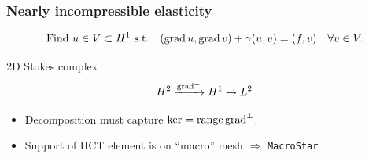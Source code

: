 \documentclass[presentation,aspectratio=43, 10pt]{beamer}
\DeclareMathOperator{\grad}{grad}
\let\div\relax
\DeclareMathOperator{\div}{div}
\DeclareMathOperator{\range}{range}
\begin{document}
\begin{frame}[fragile,t]
  \frametitle{Nearly incompressible elasticity}
  \vspace*{-1.5\baselineskip}
  \begin{equation*}
    \text{Find $u \in V \subset H^1$ s.t.} \quad (\grad u, \grad v) + \gamma (\div u, \div v) = (f, v) \quad \forall v \in V.
  \end{equation*}
  \vspace*{-\baselineskip}
  \begin{block}{2D Stokes complex}
    \begin{equation*}
      H^2 \xrightarrow{\grad^\perp} H^1 \xrightarrow{\div} L^2
    \end{equation*}
    \vspace*{-\baselineskip}
    \begin{center}
      
    \end{center}
    \begin{itemize}
    \item Decomposition must capture $\ker \div = \range \grad^\perp$.
    \item Support of HCT element is on ``macro'' mesh $\Rightarrow$ \texttt{MacroStar}
    \end{itemize}
  \end{block}
\end{frame}
\end{document}
